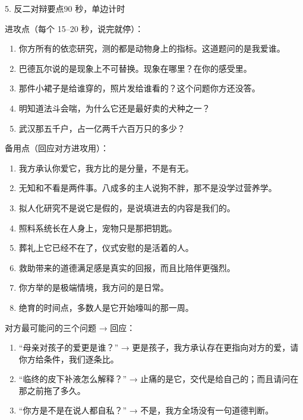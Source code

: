 \documentclass[script,con]{debate}
\begin{document}
\begin{stage}{5. 反二对辩要点}{90 秒，单边计时}
\begin{bullets}
\item 进攻点（每个 15–20 秒，说完就停）：
\begin{enumerate}[leftmargin=1.8em,itemsep=2pt,topsep=2pt]
\item 你方所有的依恋研究，测的都是动物身上的指标。这道题问的是我爱谁。
\item 巴德瓦尔说的是现象上不可替换。现象在哪里？在你的感受里。
\item 那件小裙子是给谁穿的，照片发给谁看的？这个问题你方还没答。
\item 明知道法斗会喘，为什么它还是最好卖的犬种之一？
\item 武汉那五千户，占一亿两千六百万只的多少？
\end{enumerate}
\item 备用点（回应对方进攻用）：
\begin{enumerate}[leftmargin=1.8em,itemsep=2pt,topsep=2pt]
\item 我方承认你爱它，我方比的是分量，不是有无。
\item 无知和不看是两件事。八成多的主人说狗不胖，那不是没学过营养学。
\item 拟人化研究不是说它是假的，是说填进去的内容是我们的。
\item 照料系统长在人身上，宠物只是那把钥匙。
\item 葬礼上它已经不在了，仪式安慰的是活着的人。
\item 救助带来的道德满足感是真实的回报，而且比陪伴更强烈。
\item 你方举的是极端情境，我方问的是日常。
\item 绝育的时间点，多数人是它开始嚎叫的那一周。
\end{enumerate}
\item 对方最可能问的三个问题 → 回应：
\begin{enumerate}[leftmargin=1.8em,itemsep=2pt,topsep=2pt]
\item “母亲对孩子的爱更是谁？” → 更是孩子，我方承认存在更指向对方的爱，请你方给条件，我们逐条比。
\item “临终的皮下补液怎么解释？” → 止痛的是它，交代是给自己的；而且请问在那之前拖了多久。
\item “你方是不是在说人都自私？” → 不是，我方全场没有一句道德判断。
\end{enumerate}
\end{bullets}
\end{stage}
\end{document}
